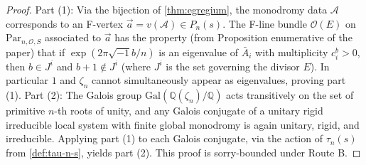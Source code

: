 \begin{proof}
  Part (1): Via the bijection of \cref{thm:egregium}, the monodromy data \(\mathcal{A}\) corresponds to an F-vertex \(\vec{a} = v(\mathcal{A}) \in P_n(s)\). The F-line bundle \(\mathcal{O}(E)\) on \(\mathrm{Par}_{n,\mathcal{O},S}\) associated to \(\vec{a}\) has the property (from Proposition enumerative of the paper) that if \(\exp(2\pi\sqrt{-1} b/n)\) is an eigenvalue of \(\bar{A}_i\) with multiplicity \(c^b_i > 0\), then \(b \in J^i\) and \(b+1 \notin J^i\) (where \(J^i\) is the set governing the divisor \(E\)). In particular \(1\) and \(\zeta_n\) cannot simultaneously appear as eigenvalues, proving part (1). Part (2): The Galois group \(\mathrm{Gal}(\mathbb{Q}(\zeta_n)/\mathbb{Q})\) acts transitively on the set of primitive \(n\)-th roots of unity, and any Galois conjugate of a unitary rigid irreducible local system with finite global monodromy is again unitary, rigid, and irreducible. Applying part (1) to each Galois conjugate, via the action of \(\tau_n(s)\) from \cref{def:tau-n-s}, yields part (2). This proof is sorry-bounded under Route B.
\end{proof}

